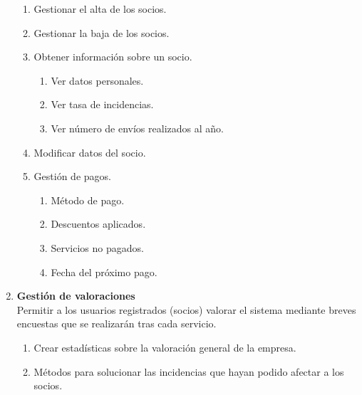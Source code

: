 \documentclass[12pt,spanish]{article}
\begin{document}
\begin{enumerate}[label=\textbf{RF-\arabic*}]
\begin{enumerate}[label=\textbf{RF-2.\arabic*}]
			\item Gestionar el alta de los socios.
			\item Gestionar la baja de los socios.
			\item Obtener información sobre un socio.
				\begin{enumerate}[label=\textbf{RF-2.3.\arabic*}]
					\item Ver datos personales.
					\item Ver tasa de incidencias.
					\item Ver número de envíos realizados al año.
				\end{enumerate}
			\item Modificar datos del socio.
			\item Gestión de pagos.	
				\begin{enumerate}[label=\textbf{RF-2.5.\arabic*}]
					\item Método de pago.
					\item Descuentos aplicados.
					\item Servicios no pagados.
					\item Fecha del próximo pago.
				\end{enumerate}
		\end{enumerate}
	\item \textbf{Gestión de valoraciones}\\ 
	Permitir a los usuarios registrados (socios) valorar el sistema	mediante breves encuestas que 	se realizarán tras cada servicio.	
	\begin{enumerate}[label=\textbf{RF-3.\arabic*}]
			\item Crear estadísticas sobre la valoración general de la empresa.
			\item Métodos para solucionar las incidencias que hayan podido afectar a los socios.
	\end{enumerate}
\end{enumerate}
\end{document}
